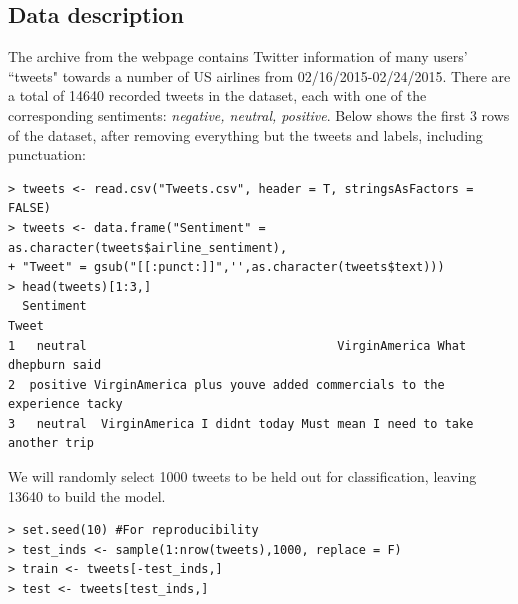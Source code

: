 \documentclass[a4paper]{article}
\begin{document}
\subsection{Data description}
The archive from the webpage contains Twitter information of many users' ``tweets" towards a number of US airlines from 02/16/2015-02/24/2015. There are a total of 14640 recorded tweets in the dataset, each with one of the corresponding sentiments: {\it negative, neutral, positive}. Below shows the first 3 rows of the dataset, after removing everything but the tweets and labels, including punctuation:
{\footnotesize{
\begin{verbatim}
> tweets <- read.csv("Tweets.csv", header = T, stringsAsFactors = FALSE)
> tweets <- data.frame("Sentiment" = as.character(tweets$airline_sentiment), 
+ "Tweet" = gsub("[[:punct:]]",'',as.character(tweets$text)))
> head(tweets)[1:3,]
  Sentiment                                                              Tweet
1   neutral                                   VirginAmerica What dhepburn said
2  positive VirginAmerica plus youve added commercials to the experience tacky
3   neutral  VirginAmerica I didnt today Must mean I need to take another trip
\end{verbatim}}}
\noindent We will randomly select 1000 tweets to be held out for classification, leaving 13640 to build the model.
{\footnotesize{
\begin{verbatim}
> set.seed(10) #For reproducibility
> test_inds <- sample(1:nrow(tweets),1000, replace = F)
> train <- tweets[-test_inds,]
> test <- tweets[test_inds,]
\end{verbatim}}}
\end{document}
